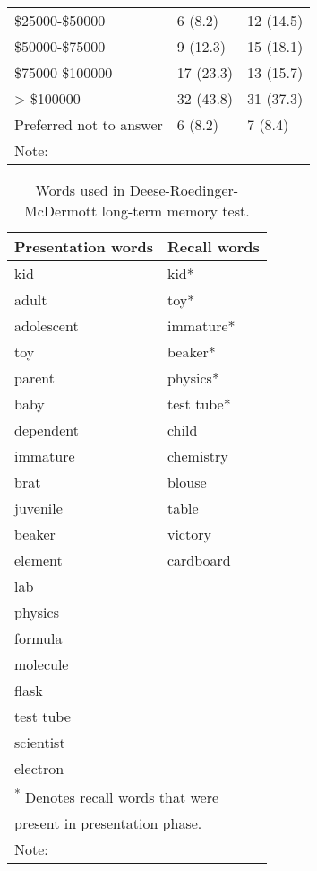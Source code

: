 \documentclass[
  english,
  ,doc,floatsintext]{apa6}
\begin{document}
\begin{table}
\begin{tabular}[t]{lll}
\hspace{1em}\$25000-\$50000 & 6 (8.2) & 12 (14.5)\\
\hspace{1em}\$50000-\$75000 & 9 (12.3) & 15 (18.1)\\
\hspace{1em}\$75000-\$100000 & 17 (23.3) & 13 (15.7)\\
\hspace{1em}> \$100000 & 32 (43.8) & 31 (37.3)\\
\hspace{1em}Preferred not to answer & 6 (8.2) & 7 (8.4)\\
\bottomrule
\multicolumn{3}{l}{\textsuperscript{} Note:}\\
\end{tabular}
\end{table}

\begin{table}

\caption{\label{tab:unnamed-chunk-2}Words used in Deese-Roedinger-McDermott long-term memory test.}
\centering
\begin{tabular}[t]{ll}
\toprule
Presentation words & Recall words\\
\midrule
kid & kid*\\
adult & toy*\\
adolescent & immature*\\
toy & beaker*\\
parent & physics*\\
\addlinespace
baby & test tube*\\
dependent & child\\
immature & chemistry\\
brat & blouse\\
juvenile & table\\
\addlinespace
beaker & victory\\
element & cardboard\\
lab & \\
physics & \\
formula & \\
\addlinespace
molecule & \\
flask & \\
test tube & \\
scientist & \\
electron & \\
\bottomrule
\multicolumn{2}{l}{\textsuperscript{*} Denotes recall words that were}\\
\multicolumn{2}{l}{present in presentation phase.}\\
\multicolumn{2}{l}{\textsuperscript{} Note:}\\
\end{tabular}
\end{table}
\end{document}
